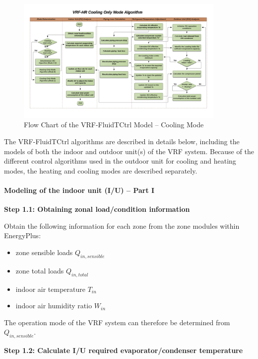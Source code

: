 \begin{figure}[hbtp] %
\centering
\includegraphics[width=0.9\textwidth, height=0.9\textheight, keepaspectratio=true]{media/VRF-FluidTCtrl-3b.png}
\caption{Flow Chart of the VRF-FluidTCtrl Model -- Cooling Mode \label{fig:vrf-fluid-t-ctrl-3b}}
\end{figure}

The VRF-FluidTCtrl algorithms are described in details below, including the models of both the indoor and outdoor unit(s) of the VRF system. Because of the different control algorithms used in the outdoor unit for cooling and heating modes, the heating and cooling modes are described separately.

\paragraph{Modeling of the indoor unit (I/U) -- Part I}\label{modeling-of-the-indoor-unit-iu-part-i}

\textbf{Step 1.1: Obtaining zonal load/condition information}

Obtain the following information for each zone from the zone modules within EnergyPlus: 

\begin{itemize}
  \item
    zone sensible loads $Q_{in, sensible}$
  \item
    zone total loads $Q_{in, total}$
  \item
    indoor air temperature $T_{in}$
  \item
    indoor air humidity ratio $W_{in}$
\end{itemize}

The operation mode of the VRF system can therefore be determined from $Q_{in, sensible}$.

\textbf{Step 1.2: Calculate I/U required evaporator/condenser temperature}

